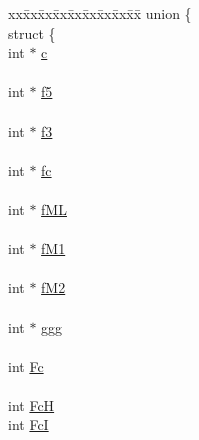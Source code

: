 \begin{DoxyCompactItemize}
\item 
\begin{tabbing}
xx\=xx\=xx\=xx\=xx\=xx\=xx\=xx\=xx\=\kill
union \{\\
\>struct \{\\
\>\>int $\ast$ \mbox{\hyperlink{group__dp__matrices_a60a511fd42905ee4f046c56a76865bf9}{c}}\\
\>\>\\
\>\>int $\ast$ \mbox{\hyperlink{group__dp__matrices_abebad693be987c2701d64477ab858039}{f5}}\\
\>\>\\
\>\>int $\ast$ \mbox{\hyperlink{group__dp__matrices_a4ea4595a93733adef047ece8e6f5da52}{f3}}\\
\>\>\\
\>\>int $\ast$ \mbox{\hyperlink{group__dp__matrices_a8ee6b6cefe20cfbf1f6bef5c788b6667}{fc}}\\
\>\>\\
\>\>int $\ast$ \mbox{\hyperlink{group__dp__matrices_a103995e4ab8e21e7f8bc36a6edcb1331}{fML}}\\
\>\>\\
\>\>int $\ast$ \mbox{\hyperlink{group__dp__matrices_ae4e598d601f5ece6b8b4ffffcae2db06}{fM1}}\\
\>\>\\
\>\>int $\ast$ \mbox{\hyperlink{group__dp__matrices_ad29106e37d485b3f20b7be468e6c179c}{fM2}}\\
\>\>\\
\>\>int $\ast$ \mbox{\hyperlink{group__dp__matrices_a0b7b86a5c75c96eabb89eb53a13e7164}{ggg}}\\
\>\>\\
\>\>int \mbox{\hyperlink{group__dp__matrices_ac6a22d71c6a0eccedf978372b19b458a}{Fc}}\\
\>\>\\
\>\>int \mbox{\hyperlink{group__dp__matrices_a1ba03c53ee2a32eaf8b46c0eb259e0c4}{FcH}}\\
\>\>int \mbox{\hyperlink{group__dp__matrices_a96ac173770c9745a30823fa17fe0b7f4}{FcI}}\\

\end{tabbing}
\end{DoxyCompactItemize}
